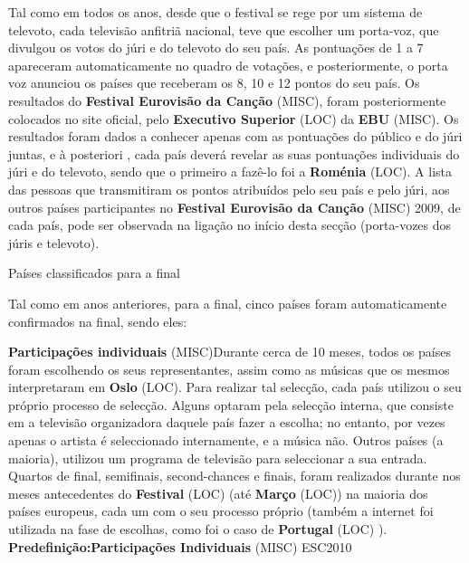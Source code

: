 \documentclass[12pt,a4paper]{article}
\begin{document}
Tal como em todos os anos, desde que o festival se rege por um sistema de televoto, cada televisão anfitriã nacional, teve que escolher um porta-voz, que divulgou os votos do júri e do televoto do seu país. As pontuações de 1 a 7 apareceram automaticamente no quadro de votações, e posteriormente, o porta voz anunciou os países que receberam os 8, 10 e 12 pontos do seu país. Os resultados do \textbf{Festival Eurovisão da Canção} (MISC), foram posteriormente colocados no site oficial, pelo \textbf{Executivo Superior} (LOC) da \textbf{EBU} (MISC). Os resultados foram dados a conhecer apenas com as pontuações do público e do júri juntas, e à posteriori , cada país deverá revelar as suas pontuações individuais do júri e do televoto, sendo que o primeiro a fazê-lo foi a \textbf{Roménia} (LOC). A lista das pessoas que transmitiram os pontos atribuídos pelo seu país e pelo júri, aos outros países participantes no \textbf{Festival Eurovisão da Canção} (MISC) 2009, de cada país, pode ser observada na ligação no início desta secção (porta-vozes dos júris e televoto).



Países classificados para a final

Tal como em anos anteriores, para a final, cinco países foram automaticamente confirmados na final, sendo eles:



\textbf{Participações individuais} (MISC)Durante cerca de 10 meses, todos os países foram escolhendo os seus representantes, assim como as músicas que os mesmos interpretaram em \textbf{Oslo} (LOC). Para realizar tal selecção, cada país utilizou o seu próprio processo de selecção. Alguns optaram pela selecção interna, que consiste em a televisão organizadora daquele país fazer a escolha; no entanto, por vezes apenas o artista é seleccionado internamente, e a música não. Outros países (a maioria), utilizou um programa de televisão para seleccionar a sua entrada. Quartos de final, semifinais, second-chances e finais, foram realizados durante nos meses antecedentes do \textbf{Festival} (LOC) (até \textbf{Março} (LOC)) na maioria dos países europeus, cada um com o seu processo próprio (também a internet foi utilizada na fase de escolhas, como foi o caso de \textbf{Portugal} (LOC) ). \textbf{Predefinição:Participações Individuais} (MISC) ESC2010
\end{document}
